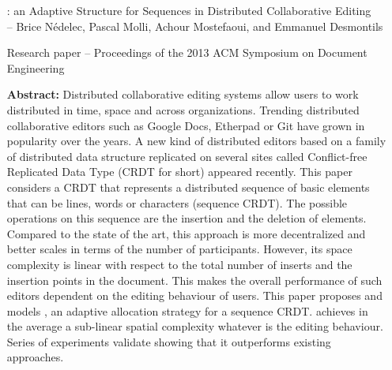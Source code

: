 \begin{itemize}
\item [\LSEQ: an Adaptive Structure for Sequences in Distributed Collaborative
  Editing]\ \\-- Brice Nédelec, Pascal Molli, Achour Mostefaoui, and Emmanuel
  Desmontils
\item [Research paper -- Proceedings of the 2013 ACM Symposium on Document
  Engineering]
\item [\textbf{Abstract:}] {\small Distributed collaborative editing systems
    allow users to work distributed in time, space and across
    organizations. Trending distributed collaborative editors such as Google
    Docs, Etherpad or Git have grown in popularity over the years. A new kind of
    distributed editors based on a family of distributed data structure
    replicated on several sites called Conflict-free Replicated Data Type (CRDT
    for short) appeared recently. This paper considers a CRDT that represents a
    distributed sequence of basic elements that can be lines, words or
    characters (sequence CRDT). The possible operations on this sequence are the
    insertion and the deletion of elements. Compared to the state of the art,
    this approach is more decentralized and better scales in terms of the number
    of participants. However, its space complexity is linear with respect to the
    total number of inserts and the insertion points in the document. This makes
    the overall performance of such editors dependent on the editing behaviour
    of users. This paper proposes and models \LSEQ, an adaptive allocation
    strategy for a sequence CRDT. \LSEQ achieves in the average a sub-linear
    spatial complexity whatever is the editing behaviour. Series of experiments
    validate \LSEQ showing that it outperforms existing approaches.}
\end{itemize}

